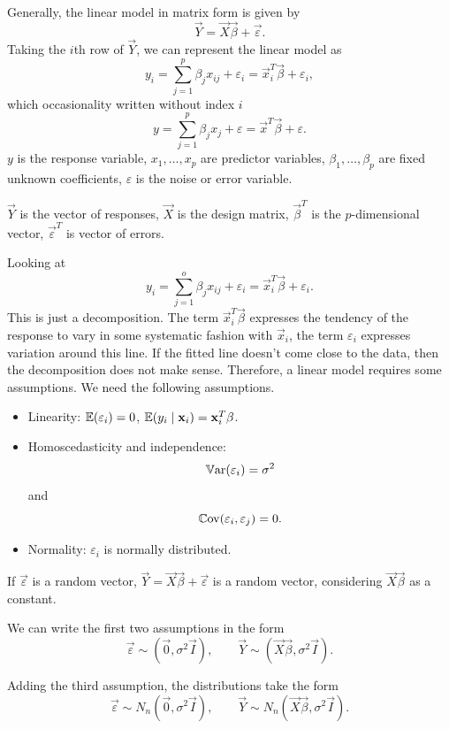 \documentclass[10pt, a4paper]{article}
\begin{document}
Generally,
the linear model in matrix form is given by
\[
\vec{Y} = \vec{X}\vec{\beta} + \vec{\varepsilon}.
\]
Taking the $i$th row of $\vec{Y}$,
we can represent the linear model as
\[
y_i = \sum_{j = 1}^{p}\beta_{j}x_{ij} + \varepsilon_i = \vec{x}_{i}^{T}\vec{\beta} + \varepsilon_i,
\]
which occasionality written without index $i$
\[
y = \sum_{j = 1}^{p}\beta_jx_j + \varepsilon = \vec{x}^{T}\vec{\beta} + \varepsilon.
\]
$y$ is the response variable,
$x_1, \dotsc, x_p$ are predictor variables,
$\beta_1, \dotsc, \beta_p$ are fixed unknown coefficients,
$\varepsilon$ is the noise or error variable.

$\vec{Y}$ is the vector of responses,
$\vec{X}$ is the design matrix,
$\vec{\beta} ^ T$ is the $p$-dimensional vector,
$\vec{\varepsilon} ^ T$ is vector of errors.

Looking at
\[
y_i = \sum_{j = 1}^{o}\beta_{j}x_{ij} + \varepsilon_i = \vec{x}_{i}^{T}\vec{\beta} + \varepsilon_i.
\]
This is just a decomposition.
The term $\vec{x}_{i}^{T}\vec{\beta}$ expresses the tendency of the response to vary in some systematic fashion with $\vec{x}_i$,
the term $\varepsilon_i$ expresses variation around this line.
If the fitted line doesn't come close to the data,
then the decomposition does not make sense.
Therefore,
a linear model requires some assumptions.
We need the following assumptions.
\begin{itemize}
    \item Linearity:
    $\mathbb{E}(\varepsilon_i) = 0$,
    $\mathbb{E}(y_i\mid\mathbf{x}_i) = \mathbf{x}_{i}^{T}\mathbf{\beta}$.

    \item Homoscedasticity and independence:
    \[
    \mathbb{V}\mathrm{ar}(\varepsilon_i) = \mathbf{\sigma} ^ 2
    \]
    and
    \[
    \mathbb{C}\mathrm{ov}(\varepsilon_i, \varepsilon_j) = 0.
    \]

    \item Normality:
    $\varepsilon_i$ is normally distributed.
\end{itemize}

If $\vec{\varepsilon}$ is a random vector,
$\vec{Y} = \vec{X}\vec{\beta} + \vec{\varepsilon}$ is a random vector,
considering $\vec{X}\vec{\beta}$ as a constant.

We can write the first two assumptions in the form
\[
\vec{\varepsilon} \sim (\vec{0}, \sigma ^ 2\vec{I}),\qquad \vec{Y} \sim (\vec{X}\vec{\beta}, \sigma ^ 2\vec{I}).
\]

Adding the third assumption,
the distributions take the form
\[
\vec{\varepsilon} \sim N_n(\vec{0}, \sigma ^ 2\vec{I}),\qquad \vec{Y} \sim N_n(\vec{X}\vec{\beta}, \sigma ^ 2\vec{I}).
\]
\end{document}
